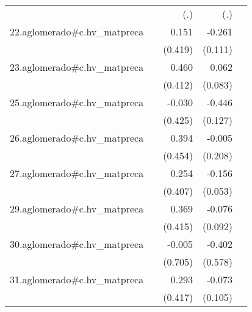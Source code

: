 {\begin{longtable}{l*{4}{D{.}{.}{-1}}}
            &                     &         (.)         &         (.)         &                     \\
\addlinespace
22.aglomerado#c.hv\_matpreca&                     &       0.151         &      -0.261\sym{*}  &                     \\
            &                     &     (0.419)         &     (0.111)         &                     \\
\addlinespace
23.aglomerado#c.hv\_matpreca&                     &       0.460         &       0.062         &                     \\
            &                     &     (0.412)         &     (0.083)         &                     \\
\addlinespace
25.aglomerado#c.hv\_matpreca&                     &      -0.030         &      -0.446\sym{***}&                     \\
            &                     &     (0.425)         &     (0.127)         &                     \\
\addlinespace
26.aglomerado#c.hv\_matpreca&                     &       0.394         &      -0.005         &                     \\
            &                     &     (0.454)         &     (0.208)         &                     \\
\addlinespace
27.aglomerado#c.hv\_matpreca&                     &       0.254         &      -0.156\sym{**} &                     \\
            &                     &     (0.407)         &     (0.053)         &                     \\
\addlinespace
29.aglomerado#c.hv\_matpreca&                     &       0.369         &      -0.076         &                     \\
            &                     &     (0.415)         &     (0.092)         &                     \\
\addlinespace
30.aglomerado#c.hv\_matpreca&                     &      -0.005         &      -0.402         &                     \\
            &                     &     (0.705)         &     (0.578)         &                     \\
\addlinespace
31.aglomerado#c.hv\_matpreca&                     &       0.293         &      -0.073         &                     \\
            &                     &     (0.417)         &     (0.105)         &                     \\

\end{longtable}}
